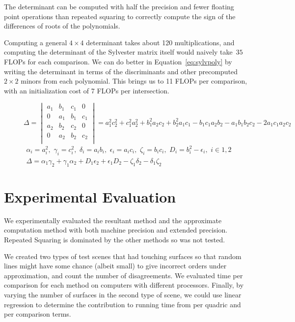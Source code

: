 \documentclass{cccg16}
\begin{document}
The determinant can be computed with half the precision and fewer
floating point operations than repeated squaring to correctly compute
the sign of the differences of roots of the polynomials.

Computing a general $4{\times} 4$ determinant takes about 120
multiplications, and computing the determinant of the Sylvester matrix
itself would naively take~$35$ FLOPs for each comparison.  We can do better in Equation~\ref{eq:sylvpoly} by writing
the determinant in terms of the discriminants and other
precomputed $2{\times} 2$ minors from each polynomial.  This brings us to 11 FLOPs per comparison, with an
initialization cost of 7 FLOPs per intersection.

\begin{figure}
  \begin{equation*}
    \Delta=\begin{vmatrix}
    a_1 & b_1 & c_1 & 0\\
    0 & a_1 & b_1 & c_1\\
    a_2 & b_2 & c_2 & 0\\
    0 & a_2 & b_2 & c_2\\
    \end{vmatrix}=
    a_1^2 c_2^2 + c_1^2 a_2^2 + b_1^2 a_2 c_2 + b_2^2 a_1 c_1 -
    b_1 c_1 a_2 b_2 - a_1 b_1 b_2 c_2 - 2 a_1 c_1 a_2 c_2
  \end{equation*}
  \begin{align}
    \alpha_i=a_i^2,\,\, \gamma_i=c_i^2,\,\,
    \delta_i=a_i b_i,\,\, \epsilon_i=a_i c_i,\,\, \zeta_i=b_i c_i,\,\,
    D_i=b_i^2-\epsilon_i,\,\,
    i\in {1, 2}\\
    \Delta = \alpha_1 \gamma_2 + \gamma_1 \alpha_2 +
    D_1 \epsilon_2 + \epsilon_1 D_2 - \zeta_1 \delta_2 -
    \delta_1 \zeta_2
  \label{eq:sylvpoly}
  \end{align}
\end{figure}

\section{Experimental Evaluation}
We experimentally evaluated the resultant method and the approximate
computation method with both machine precision and extended precision.
Repeated Squaring is dominated by the other methods so was not tested.

We created two types of test scenes that had touching surfaces so that
random lines might have some chance (albeit small) to give incorrect
orders under approximation, and count the number of disagreements.  We
evaluated time per comparison for each method on computers with
different processors.  Finally, by varying the number of surfaces in
the second type of scene, we could use linear regression to determine
the contribution to running time from per quadric and per comparison
terms.
 
\end{document}
